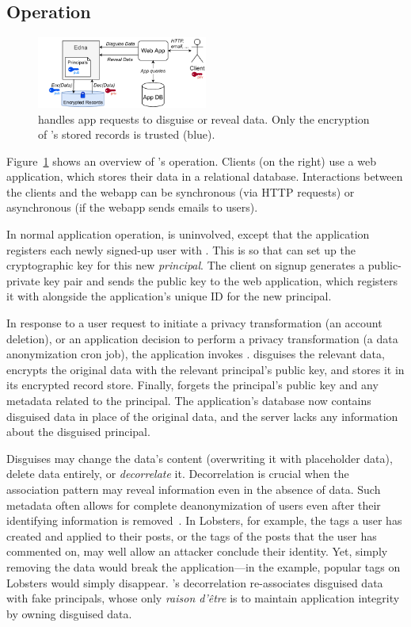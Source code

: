 \subsection{\sys Operation}

\begin{figure}[t]
  \centering
    \includegraphics[width=0.5\textwidth]{figs/edna_arch}
  \caption{\sys handles app requests to disguise or reveal data. Only the
    encryption of \sys's stored records is trusted (blue).}
  \label{f:edna-overview}
\end{figure}

%
Figure~\ref{f:edna-overview} shows an overview of \sys's operation.
%
Clients (on the right) use a web application, which stores their data in a
relational database.
%
Interactions between the clients and the webapp can be synchronous (via HTTP
requests) or asynchronous (\eg if the webapp sends emails to users).
%

%
In normal application operation, \sys is uninvolved, except that the application
registers each newly signed-up user with \sys.
%
This is so that \sys can set up the cryptographic key for this new \emph{principal}.
%
The client on signup generates a public-private key pair and sends the public
key to the web application, which registers it with \sys alongside the
application's unique ID for the new principal.
%

%
In response to a user request to initiate a privacy transformation (\eg an account
deletion), or an application decision to perform a privacy transformation (\eg a
data anonymization cron job), the application invokes \sys.
%
\sys disguises the relevant data, encrypts the original data with the relevant
principal's public key, and stores it in its encrypted record store.
%
Finally, \sys forgets the principal's public key and any metadata related to the
principal.
%
The application's database now contains disguised data in place of the original
data, and the server lacks any information about the disguised principal.
%

%
Disguises may change the data's content (\eg overwriting it with placeholder data),
delete data entirely, or \emph{decorrelate} it.
%
Decorrelation is crucial when the association pattern may reveal information
even in the absence of data.
%
Such metadata often allows for complete deanonymization of users even after their
identifying information is removed~\cite{xxx}.
%
In Lobsters, for example, the tags a user has created and applied to their posts,
or the tags of the posts that the user has commented on, may well allow an attacker
conclude their identity.
%
Yet, simply removing the data would break the application---in the example,
popular tags on Lobsters would simply disappear.
%
\sys's decorrelation re-associates disguised data with fake principals, whose
only \emph{raison d'être} is to maintain application integrity by owning disguised
data.
%

